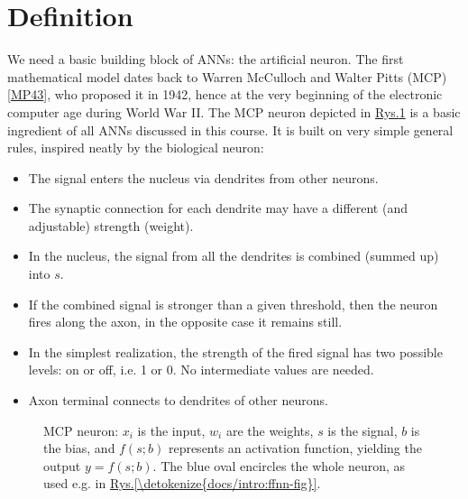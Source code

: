 \documentclass[a4paper,12pt,polish]{jupyterBook}
\let\sphinxpxdimen\pdfpxdimen\else\newdimen\sphinxpxdimen
\begin{document}
\section{Definition}
\label{\detokenize{docs/mcp:definition}}
\sphinxAtStartPar
We need a basic building block of ANNs: the artificial neuron. The first mathematical model dates back to Warren McCulloch and Walter Pitts (MCP){[}\hyperlink{cite.docs/conclusion:id9}{MP43}{]}, who proposed it in 1942, hence at the very beginning of the electronic computer age during World War II. The MCP neuron depicted in \hyperref[\detokenize{docs/mcp:mcp1-fig}]{Rys.\@ \ref{\detokenize{docs/mcp:mcp1-fig}}} is a basic ingredient of all ANNs discussed in this course. It is built on very simple general rules, inspired neatly by the biological neuron:
\begin{itemize}
\item {} 
\sphinxAtStartPar
The signal enters the nucleus via dendrites from other neurons.

\item {} 
\sphinxAtStartPar
The synaptic connection for each dendrite may have a different (and adjustable) strength (weight).

\item {} 
\sphinxAtStartPar
In the nucleus, the signal from all the dendrites is combined (summed up) into \(s\).

\item {} 
\sphinxAtStartPar
If the combined signal is stronger than a given threshold, then the neuron fires along the axon, in the opposite case it remains still.

\item {} 
\sphinxAtStartPar
In the simplest realization, the strength of the fired signal has two possible levels: on or off, i.e. 1 or 0. No intermediate values are needed.

\item {} 
\sphinxAtStartPar
Axon terminal connects to dendrites of other neurons.

\end{itemize}

\begin{figure}[htbp]
\centering
\capstart

\noindent\sphinxincludegraphics[width=320\sphinxpxdimen]{{mcp-1a}.png}
\caption{MCP neuron: \(x_i\) is the input, \(w_i\) are the weights, \(s\) is the signal, \(b\) is the bias, and \(f(s;b)\) represents an activation function, yielding the output \(y=f(s;b)\). The blue oval encircles the whole neuron, as used e.g. in \hyperref[\detokenize{docs/intro:ffnn-fig}]{Rys.\@ \ref{\detokenize{docs/intro:ffnn-fig}}}.}\label{\detokenize{docs/mcp:mcp1-fig}}\end{figure}
\end{document}
